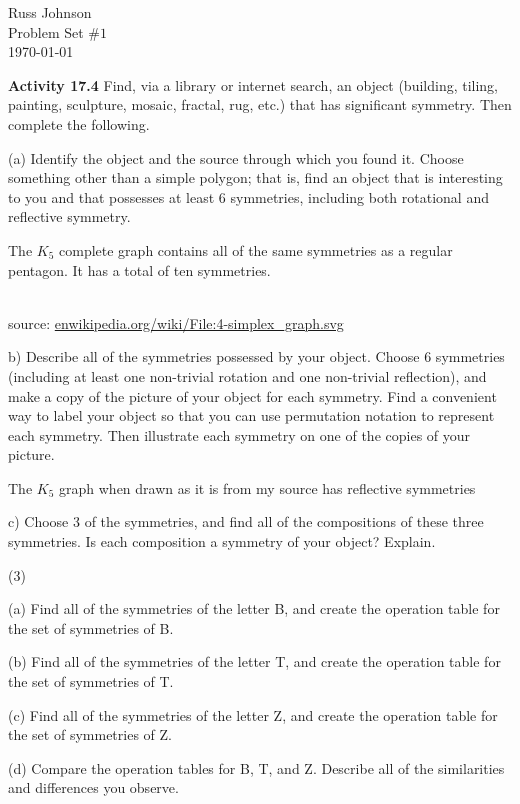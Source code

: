 \documentclass[11pt,a4paper]{article}
\begin{document}
\begin{flushright}
Russ Johnson\\
Problem Set $\#1$\\
\today\\
\end{flushright}

{\bf Activity 17.4} Find, via a library or internet search, an object (building, tiling,
painting, sculpture, mosaic, fractal, rug, etc.) that has significant symmetry. Then
complete the following.

(a) Identify the object and the source through which you found it. Choose something other than a simple polygon; that is, find an object that is interesting to you and that possesses at least 6 symmetries, including both rotational and reflective symmetry.

The $K_5$ complete graph contains all of the same symmetries as a regular pentagon. It has a total of ten symmetries.\\
~\\
\begin{flushright}
source: \url{enwikipedia.org/wiki/File:4-simplex_graph.svg}
\end{flushright}

b) Describe all of the symmetries possessed by your object. Choose 6 symmetries (including at least one non-trivial rotation and one non-trivial reflection), and make a copy of the picture of your object for each symmetry.
Find a convenient way to label your object so that you can use permutation notation to represent each symmetry. Then illustrate each symmetry on one of the copies of your picture.

The $K_5$ graph when drawn as it is from my source has reflective symmetries 

c) Choose 3 of the symmetries, and find all of the compositions of these three symmetries. Is each composition a symmetry of your object? Explain.

(3) 

(a) Find all of the symmetries of the letter B, and create the operation table
for the set of symmetries of B.

(b) Find all of the symmetries of the letter T, and create the operation table
for the set of symmetries of T.

(c) Find all of the symmetries of the letter Z, and create the operation table
for the set of symmetries of Z.

(d) Compare the operation tables for B, T, and Z. Describe all of the similarities and differences you observe.
\end{document}
